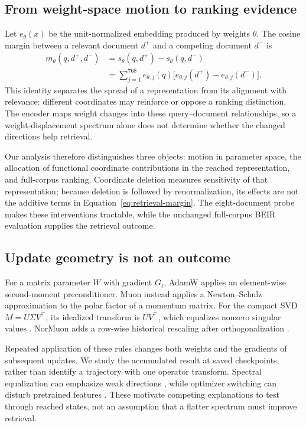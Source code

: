 \documentclass[11pt]{article}
\begin{document}
\subsection{From weight-space motion to ranking evidence}

Let $e_\theta(x)$ be the unit-normalized embedding produced by weights $\theta$.
The cosine margin between a relevant document $d^+$ and a competing document $d^-$ is
\begin{align}
m_\theta(q,d^+,d^-)
&=s_\theta(q,d^+)-s_\theta(q,d^-) \nonumber\\
&=\sum_{j=1}^{768} e_{\theta,j}(q)
 \bigl[e_{\theta,j}(d^+)-e_{\theta,j}(d^-)\bigr].
\label{eq:retrieval-margin}
\end{align}
This identity separates the spread of a representation from its alignment with relevance:
different coordinates may reinforce or oppose a ranking distinction. The encoder maps weight
changes into these query--document relationships, so a weight-displacement spectrum alone does
not determine whether the changed directions help retrieval.

Our analysis therefore distinguishes three objects: motion in parameter space, the allocation of
functional coordinate contributions in the reached representation, and full-corpus ranking.
Coordinate deletion measures sensitivity of that representation; because deletion is followed by
renormalization, its effects are not the additive terms in Equation~\ref{eq:retrieval-margin}.
The eight-document probe makes these interventions tractable, while the unchanged full-corpus
BEIR evaluation supplies the retrieval outcome.

\subsection{Update geometry is not an outcome}

For a matrix parameter $W$ with gradient $G_t$, AdamW applies an element-wise second-moment
preconditioner. Muon instead applies a Newton--Schulz approximation to the polar factor of a momentum
matrix. For the compact SVD $M=U\Sigma V^\top$, its idealized transform is $UV^\top$, which equalizes
nonzero singular values \citep{jordan2024muon}. NorMuon adds a row-wise historical rescaling after
orthogonalization \citep{li2025normuon}.

Repeated application of these rules changes both weights and the gradients of subsequent updates.
We study the accumulated result at saved checkpoints, rather than identify a trajectory with one
operator transform. Spectral equalization can emphasize weak directions
\citep{pang2026htmuon}, while optimizer switching can disturb pretrained features
\citep{qu2026finetune}. These motivate competing explanations to test through reached states,
not an assumption that a flatter spectrum must improve retrieval.
\end{document}
